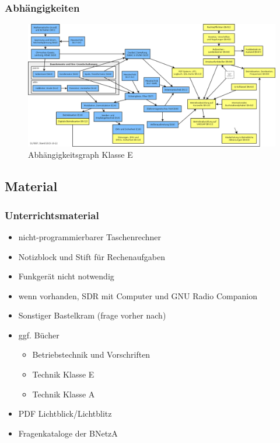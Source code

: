 \begin{frame}
  \frametitle{Abhängigkeiten}
  \begin{center}
    \begin{figure}
      \includegraphics[height=.75\textheight,width=\textwidth,keepaspectratio]{o00/Abhaengigkeitsgraph.png}
      \caption{Abhängigkeitsgraph Klasse E}
    \end{figure}
  \end{center}
\end{frame}


\subsection{Material}

\begin{frame}
  \frametitle{Unterrichtsmaterial}

  \begin{itemize}
    \item nicht-programmierbarer Taschenrechner
    \item Notizblock und Stift für Rechenaufgaben
    \item Funkgerät nicht notwendig
    \item wenn vorhanden, SDR mit Computer und GNU Radio Companion
    \item Sonstiger Bastelkram (frage vorher nach)
    \item ggf. Bücher
      \begin{itemize}
        \item Betriebstechnik und Vorschriften \hyperlink{refs}{\cite{bv}}
        \item Technik Klasse E \hyperlink{refs}{\cite{ale}}
        \item Technik Klasse A \hyperlink{refs}{\cite{ala}}
      \end{itemize}
    \item PDF Lichtblick/Lichtblitz \hyperlink{refs}{\cite{lb}}
    \item Fragenkataloge der BNetzA
  \end{itemize}
\end{frame}


